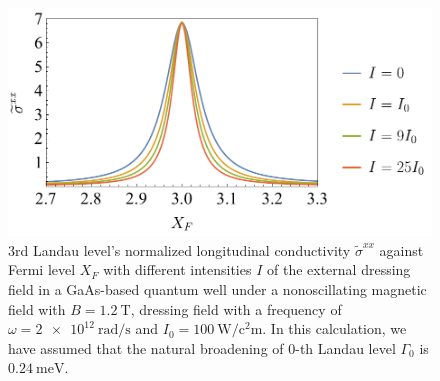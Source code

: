\begin{figure}[t]
\includegraphics[scale=0.55]{figures/fig_5}
\caption{$3$rd Landau level’s normalized longitudinal conductivity $\widetilde{\sigma}^{xx}$ against Fermi level $X_F$ with different intensities $I$ of the external dressing field in a GaAs-based quantum well under a nonoscillating magnetic field with $B = \SI{1.2}{\tesla}$, dressing field with a frequency of $\omega =\SI{2e12}{\radian\per\second}$ and $I_0 =\SI{100}{\watt\per\square\centi\metre}$.
In this calculation, we have assumed that the natural  broadening of $0$-th Landau level $\Gamma_0$ is $\SI{0.24}{\milli\eV}$.}
\label{fig:6}
\end{figure}
